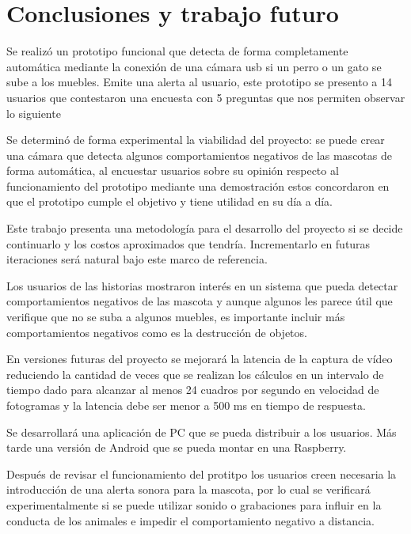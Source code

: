 \section{Conclusiones y trabajo futuro}
\label{sec:conclusiones}

Se realizó un prototipo funcional que detecta de forma completamente automática mediante la conexión de una cámara usb si un perro o un gato se sube a los muebles. Emite una alerta al usuario, este prototipo se presento a 14 usuarios que contestaron una encuesta con 5 preguntas que nos permiten observar lo siguiente

Se determinó de forma experimental la viabilidad del proyecto: se puede crear una cámara que detecta algunos comportamientos negativos de las mascotas de forma automática, al encuestar usuarios sobre su opinión respecto al funcionamiento del prototipo mediante una demostración estos concordaron en que el prototipo cumple el objetivo y tiene utilidad en su día a día.

Este trabajo presenta una metodología para el desarrollo del proyecto si se decide continuarlo y los costos aproximados que tendría. Incrementarlo en futuras iteraciones será natural bajo este marco de referencia.

Los usuarios de las historias mostraron interés en un sistema que pueda detectar comportamientos negativos de las mascota y aunque algunos les parece útil que verifique que no se suba a algunos muebles, es importante incluir más comportamientos negativos como es la destrucción de objetos.

En versiones futuras del proyecto se mejorará la latencia de la captura de vídeo reduciendo la cantidad de veces que se realizan los cálculos en un intervalo de tiempo dado para alcanzar al menos 24 cuadros por segundo en velocidad de fotogramas y la latencia debe ser menor a 500 ms en tiempo de respuesta.

Se desarrollará una aplicación de PC que se pueda distribuir a los usuarios. Más tarde una versión de Android que se pueda montar en una Raspberry.

Después de revisar el funcionamiento del protitpo los usuarios creen necesaria la introducción de una alerta sonora para la mascota, por lo cual se verificará experimentalmente si se puede utilizar sonido o grabaciones para influir en la conducta de los animales e impedir el comportamiento negativo a distancia.

